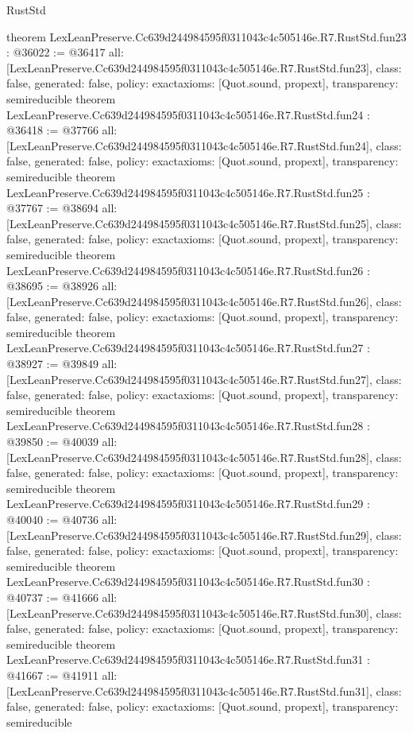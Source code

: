 \begin{lexlean}{RustStd}
\begin{coremodule}
{}
theorem LexLeanPreserve.Cc639d244984595f0311043c4c505146e.R7.RustStd.fun23 : @36022 := @36417 {
  all: [LexLeanPreserve.Cc639d244984595f0311043c4c505146e.R7.RustStd.fun23],
  class: false,
  generated: false,
  policy: exact{axioms: [Quot.sound, propext]},
  transparency: semireducible
}
theorem LexLeanPreserve.Cc639d244984595f0311043c4c505146e.R7.RustStd.fun24 : @36418 := @37766 {
  all: [LexLeanPreserve.Cc639d244984595f0311043c4c505146e.R7.RustStd.fun24],
  class: false,
  generated: false,
  policy: exact{axioms: [Quot.sound, propext]},
  transparency: semireducible
}
theorem LexLeanPreserve.Cc639d244984595f0311043c4c505146e.R7.RustStd.fun25 : @37767 := @38694 {
  all: [LexLeanPreserve.Cc639d244984595f0311043c4c505146e.R7.RustStd.fun25],
  class: false,
  generated: false,
  policy: exact{axioms: [Quot.sound, propext]},
  transparency: semireducible
}
theorem LexLeanPreserve.Cc639d244984595f0311043c4c505146e.R7.RustStd.fun26 : @38695 := @38926 {
  all: [LexLeanPreserve.Cc639d244984595f0311043c4c505146e.R7.RustStd.fun26],
  class: false,
  generated: false,
  policy: exact{axioms: [Quot.sound, propext]},
  transparency: semireducible
}
theorem LexLeanPreserve.Cc639d244984595f0311043c4c505146e.R7.RustStd.fun27 : @38927 := @39849 {
  all: [LexLeanPreserve.Cc639d244984595f0311043c4c505146e.R7.RustStd.fun27],
  class: false,
  generated: false,
  policy: exact{axioms: [Quot.sound, propext]},
  transparency: semireducible
}
theorem LexLeanPreserve.Cc639d244984595f0311043c4c505146e.R7.RustStd.fun28 : @39850 := @40039 {
  all: [LexLeanPreserve.Cc639d244984595f0311043c4c505146e.R7.RustStd.fun28],
  class: false,
  generated: false,
  policy: exact{axioms: [Quot.sound, propext]},
  transparency: semireducible
}
theorem LexLeanPreserve.Cc639d244984595f0311043c4c505146e.R7.RustStd.fun29 : @40040 := @40736 {
  all: [LexLeanPreserve.Cc639d244984595f0311043c4c505146e.R7.RustStd.fun29],
  class: false,
  generated: false,
  policy: exact{axioms: [Quot.sound, propext]},
  transparency: semireducible
}
theorem LexLeanPreserve.Cc639d244984595f0311043c4c505146e.R7.RustStd.fun30 : @40737 := @41666 {
  all: [LexLeanPreserve.Cc639d244984595f0311043c4c505146e.R7.RustStd.fun30],
  class: false,
  generated: false,
  policy: exact{axioms: [Quot.sound, propext]},
  transparency: semireducible
}
theorem LexLeanPreserve.Cc639d244984595f0311043c4c505146e.R7.RustStd.fun31 : @41667 := @41911 {
  all: [LexLeanPreserve.Cc639d244984595f0311043c4c505146e.R7.RustStd.fun31],
  class: false,
  generated: false,
  policy: exact{axioms: [Quot.sound, propext]},
  transparency: semireducible
}
\end{coremodule}
\end{lexlean}
